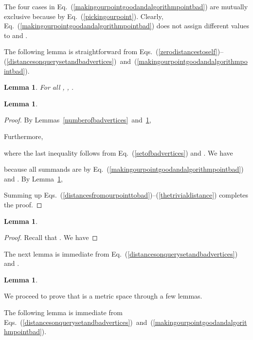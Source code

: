 \documentclass[letterpaper,12pt]{article}
\newtheorem{lemma}[theorem]{Lemma}
\begin{document}
{The four cases
in Eq.~(\ref{makingourpointgoodandalgorithmpointbad})
are mutually exclusive because  by
Eq.~(\ref{pickingourpoint}).
Clearly, Eq.~(\ref{makingourpointgoodandalgorithmpointbad}) does not assign
different values to  and .

The following lemma is straightforward from
Eqs.~(\ref{zerodistancestoself})--(\ref{distancesonquerysetandbadvertices})~and~(\ref{makingourpointgoodandalgorithmpointbad}).

\begin{lemma}\label{rangeofdistances}
For all , , .
\end{lemma}


\begin{lemma}\label{speciallydesignedpointisgood}

\end{lemma}
\begin{proof}
By Lemmas~\ref{numberofbadvertices}~and~\ref{rangeofdistances},

Furthermore,

where the last inequality follows from Eq.~(\ref{setofbadvertices})
and .
We have

because all summands are  by
Eq.~(\ref{makingourpointgoodandalgorithmpointbad}) and .
By Lemma~\ref{rangeofdistances},

Summing up
Eqs.~(\ref{distancesfromourpointtobad})--(\ref{thetrivialdistance})
completes the proof.
\end{proof}

\begin{lemma}\label{outputpointisterribleifnotbad}

\end{lemma}
\begin{proof}
Recall that .
We have

\end{proof}

The next lemma is immediate from Eq.~(\ref{distancesonquerysetandbadvertices})
and .

\begin{lemma}\label{outputpointisterribleifbad}

\end{lemma}

We proceed to prove that  is a metric space through a few lemmas.








The following
lemma is
immediate from
Eqs.~(\ref{distancesonquerysetandbadvertices})~and~(\ref{makingourpointgoodandalgorithmpointbad}).

}
\end{document}
